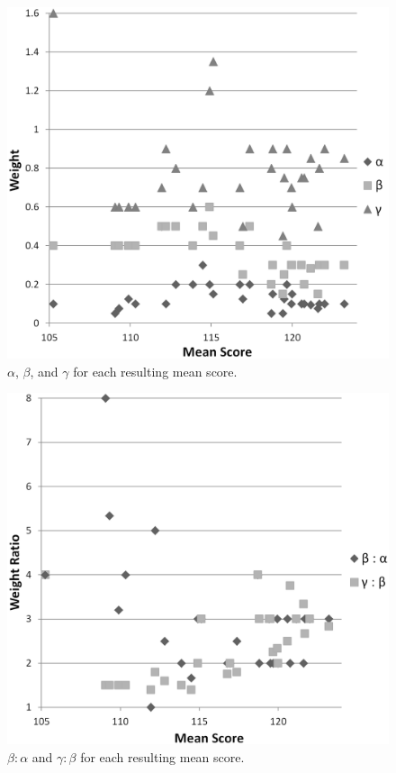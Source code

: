 \documentclass[letterpaper]{article}
\begin{document}
\begin{figure}[t]
\begin{center}
\includegraphics[width=1\linewidth]{images/1-2-3_weights.png}
\end{center}
\caption{$\alpha$, $\beta$, and $\gamma$ for each resulting mean score.}
\label{fig:123weights}
\end{figure}

\begin{figure}[t]
\begin{center}
\includegraphics[width=1\linewidth]{images/1-2-3_ratios.png}
\end{center}
\caption{$\beta:\alpha$ and $\gamma:\beta$ for each resulting mean score.}
\label{fig:123ratios}
\end{figure}
\end{document}
